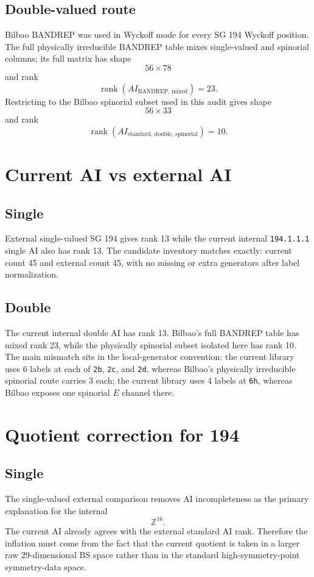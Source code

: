 \documentclass[11pt]{article}
\begin{document}
\subsection{Double-valued route}
Bilbao BANDREP was used in Wyckoff mode for every SG 194 Wyckoff position. The full physically irreducible BANDREP table mixes single-valued and spinorial columns; its full matrix has shape
\[
56 \times 78
\]
and rank
\[
\operatorname{rank}(AI_{\mathrm{BANDREP},\,\mathrm{mixed}}) = 23.
\]
Restricting to the Bilbao spinorial subset used in this audit gives shape
\[
56 \times 33
\]
and rank
\[
\operatorname{rank}(AI_{\mathrm{standard},\,\mathrm{double},\,\mathrm{spinorial}}) = 10.
\]

\section{Current AI vs external AI}
\subsection{Single}
External single-valued SG 194 gives rank 13 while the current internal \texttt{194.1.1.1} single AI also has rank 13. The candidate inventory matches exactly: current count 45 and external count 45, with no missing or extra generators after label normalization.

\subsection{Double}
The current internal double AI has rank 13. Bilbao's full BANDREP table has mixed rank 23, while the physically spinorial subset isolated here has rank 10. The main mismatch sits in the local-generator convention: the current library uses 6 labels at each of \texttt{2b}, \texttt{2c}, and \texttt{2d}, whereas Bilbao's physically irreducible spinorial route carries 3 each; the current library uses 4 labels at \texttt{6h}, whereas Bilbao exposes one spinorial $E$ channel there.

\section{Quotient correction for 194}
\subsection{Single}
The single-valued external comparison removes AI incompleteness as the primary explanation for the internal
\[
\mathbb{Z}^{16}.
\]
The current AI already agrees with the external standard AI rank. Therefore the inflation must come from the fact that the current quotient is taken in a larger raw 29-dimensional BS space rather than in the standard high-symmetry-point symmetry-data space.
\end{document}
